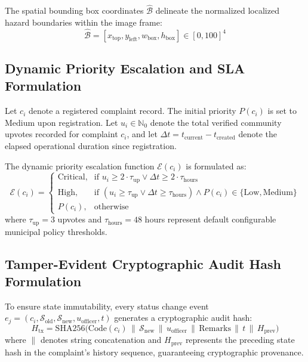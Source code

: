 \documentclass[12pt,a4paper]{report}
\begin{document}
The spatial bounding box coordinates $\hat{\mathcal{B}}$ delineate the normalized localized hazard boundaries within the image frame:
\begin{equation}
    \hat{\mathcal{B}} = [x_{\text{top}}, y_{\text{left}}, w_{\text{box}}, h_{\text{box}}] \in [0, 100]^4
\end{equation}

\subsection{Dynamic Priority Escalation and SLA Formulation}
Let $c_i$ denote a registered complaint record. The initial priority $P(c_i)$ is set to $\text{Medium}$ upon registration. Let $u_i \in \mathbb{N}_0$ denote the total verified community upvotes recorded for complaint $c_i$, and let $\Delta t = t_{\text{current}} - t_{\text{created}}$ denote the elapsed operational duration since registration.

The dynamic priority escalation function $\mathcal{E}(c_i)$ is formulated as:
\begin{equation}
    \mathcal{E}(c_i) = \begin{cases}
        \text{Critical}, & \text{if } u_i \ge 2 \cdot \tau_{\text{up}} \lor \Delta t \ge 2 \cdot \tau_{\text{hours}} \\
        \text{High}, & \text{if } (u_i \ge \tau_{\text{up}} \lor \Delta t \ge \tau_{\text{hours}}) \land P(c_i) \in \{\text{Low}, \text{Medium}\} \\
        P(c_i), & \text{otherwise}
    \end{cases}
\end{equation}
where $\tau_{\text{up}} = 3$ upvotes and $\tau_{\text{hours}} = 48$ hours represent default configurable municipal policy thresholds.

\subsection{Tamper-Evident Cryptographic Audit Hash Formulation}
To ensure state immutability, every status change event $e_j = (c_i, \mathcal{S}_{\text{old}}, \mathcal{S}_{\text{new}}, u_{\text{officer}}, t)$ generates a cryptographic audit hash:
\begin{equation}
    H_{\text{tx}} = \mathrm{SHA256}\Big( \mathrm{Code}(c_i) \,\|\, \mathcal{S}_{\text{new}} \,\|\, u_{\text{officer}} \,\|\, \mathrm{Remarks} \,\|\, t \,\|\, H_{\text{prev}} \Big)
\end{equation}
where $\|$ denotes string concatenation and $H_{\text{prev}}$ represents the preceding state hash in the complaint's history sequence, guaranteeing cryptographic provenance.
\end{document}
